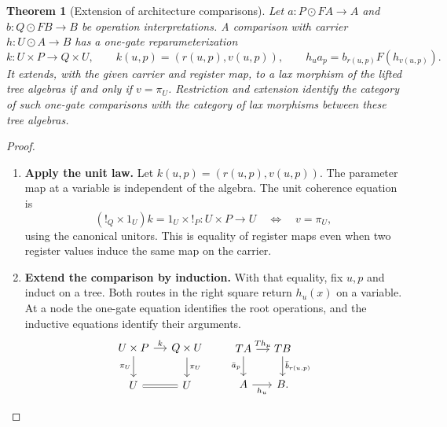 \documentclass[11pt,a4paper]{article}
\newtheorem{theorem}{Theorem}[section]
\theoremstyle{definition}
\theoremstyle{remark}\newaliascnt{remark}{theorem}
\numberwithin{equation}{section}
\begin{document}
\begin{theorem}[Extension of architecture comparisons]\label{thm:cell-ext}
Let $a:P\odot FA\to A$ and $b:Q\odot FB\to B$ be operation interpretations. A comparison with carrier $h:U\odot A\to B$ has a one-gate reparameterization
\[
 k:U\times P\longrightarrow Q\times U,\qquad
 k(u,p)=(r(u,p),v(u,p)),\qquad
 h_u a_p=b_{r(u,p)}F(h_{v(u,p)}).
\]
It extends, with the given carrier and register map, to a lax morphism of the lifted tree algebras if and only if $v=\pi_U$. Restriction and extension identify the category of such one-gate comparisons with the category of lax morphisms between these tree algebras.
\end{theorem}
\begin{proof}\leavevmode
\begin{enumerate}[titledsteps]
    \item \textbf{Apply the unit law.} Let \(k(u,p)=(r(u,p),v(u,p))\). The parameter map at a variable is independent of the algebra. The unit coherence equation is
\[
 (!_{Q}\times1_U)k=1_U\times!_P:U\times P\longrightarrow U
             \quad\Longleftrightarrow\quad v=\pi_U,
\]
using the canonical unitors. This is equality of register maps even when two register values induce the same map on the carrier.


    \item \textbf{Extend the comparison by induction.} With that equality, fix $u,p$ and induct on a tree. Both routes in the right square return $h_u(x)$ on a variable. At a node the one-gate equation identifies the root operations, and the inductive equations identify their arguments.
\[
\begin{tikzcd}[column sep=small]
 U\times P\arrow[r,"k"]\arrow[d,"\pi_U"']&Q\times U\arrow[d,"\pi_U"]\\
 U\arrow[r,equal]&U
\end{tikzcd}
\qquad
\begin{tikzcd}[column sep=small]
 TA\arrow[r,"Th_u"]\arrow[d,"\bar a_p"']&TB\arrow[d,"{\bar b_{r(u,p)}}"]\\
 A\arrow[r,"h_u"']&B .
\end{tikzcd}
\]


\end{enumerate}
\end{proof}
\end{document}
